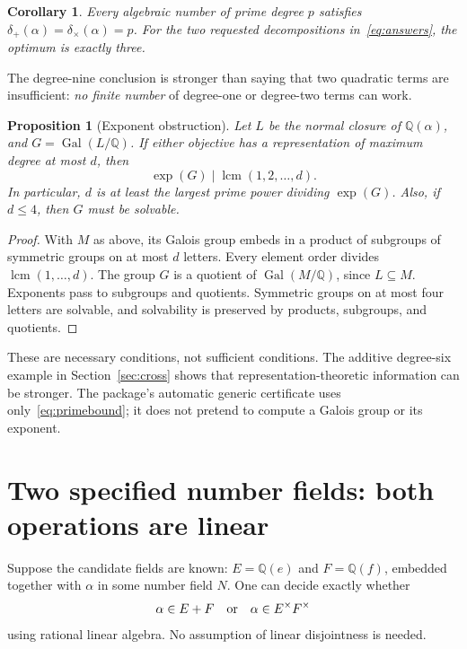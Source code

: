 \documentclass[11pt,letterpaper]{article}
\newtheorem{proposition}[theorem]{Proposition}
\newtheorem{corollary}[theorem]{Corollary}
\theoremstyle{definition}\newtheorem{definition}[theorem]{Definition}
\theoremstyle{remark}\newtheorem{remark}[theorem]{Remark}
\newcommand{\Q}{\mathbb Q}
\newcommand{\Gal}{\operatorname{Gal}}
\newcommand{\lcm}{\operatorname{lcm}}
\newcommand{\ds}{\delta_{+}}
\newcommand{\dm}{\delta_{\times}}
\begin{document}
\begin{corollary}
Every algebraic number of prime degree $p$ satisfies $\ds(\alpha)=\dm(\alpha)=p$. For the two requested decompositions in~\eqref{eq:answers}, the optimum is exactly three.
\end{corollary}
The degree-nine conclusion is stronger than saying that two quadratic terms are insufficient: \emph{no finite number} of degree-one or degree-two terms can work.

\begin{proposition}[Exponent obstruction]
\label{prop:exponent}
Let $L$ be the normal closure of $\Q(\alpha)$, and $G=\Gal(L/\Q)$. If either objective has a representation of maximum degree at most $d$, then
\begin{equation}
 \exp(G)\mid\lcm(1,2,\ldots,d).
 \label{eq:exponentbound}
\end{equation}
In particular, $d$ is at least the largest prime power dividing $\exp(G)$. Also, if $d\le4$, then $G$ must be solvable.
\end{proposition}
\begin{proof}
With $M$ as above, its Galois group embeds in a product of subgroups of symmetric groups on at most $d$ letters. Every element order divides $\lcm(1,\ldots,d)$. The group $G$ is a quotient of $\Gal(M/\Q)$, since $L\subseteq M$. Exponents pass to subgroups and quotients. Symmetric groups on at most four letters are solvable, and solvability is preserved by products, subgroups, and quotients.
\end{proof}

These are necessary conditions, not sufficient conditions. The additive degree-six example in Section~\ref{sec:cross} shows that representation-theoretic information can be stronger. The package's automatic generic certificate uses only~\eqref{eq:primebound}; it does not pretend to compute a Galois group or its exponent.

\section{Two specified number fields: both operations are linear}
\label{sec:twofields}
Suppose the candidate fields are known: $E=\Q(e)$ and $F=\Q(f)$, embedded together with $\alpha$ in some number field $N$. One can decide exactly whether
\[
 \alpha\in E+F\quad\hbox{or}\quad\alpha\in E^\times F^\times
\]
using rational linear algebra. No assumption of linear disjointness is needed.
\end{document}
